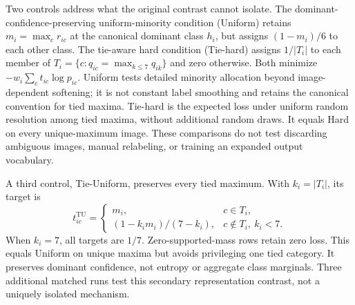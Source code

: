 \documentclass[pdflatex,sn-mathphys-num]{sn-jnl}
\begin{document}
Two controls address what the original contrast cannot isolate. The dominant-confidence-preserving uniform-minority condition (Uniform) retains $m_i=\max_c r_{ic}$ at the canonical dominant class $h_i$, but assigns $(1-m_i)/6$ to each other class. The tie-aware hard condition (Tie-hard) assigns $1/|T_i|$ to each member of $T_i=\{c:q_{ic}=\max_{k\leq7}q_{ik}\}$ and zero otherwise. Both minimize $-w_i\sum_c t_{ic}\log p_{ic}$. Uniform tests detailed minority allocation beyond image-dependent softening; it is not constant label smoothing and retains the canonical convention for tied maxima. Tie-hard is the expected loss under uniform random resolution among tied maxima, without additional random draws. It equals Hard on every unique-maximum image. These comparisons do not test discarding ambiguous images, manual relabeling, or training an expanded output vocabulary.

A third control, Tie-Uniform, preserves every tied maximum. With $k_i=|T_i|$, its target is
\begin{equation}
t_{ic}^{\mathrm{TU}}=\begin{cases}m_i,&c\in T_i,\\(1-k_i m_i)/(7-k_i),&c\notin T_i,\ k_i<7.\end{cases}
\end{equation}
When $k_i=7$, all targets are $1/7$. Zero-supported-mass rows retain zero loss. This equals Uniform on unique maxima but avoids privileging one tied category. It preserves dominant confidence, not entropy or aggregate class marginals. Three additional matched runs test this secondary representation contrast, not a uniquely isolated mechanism.
\end{document}
